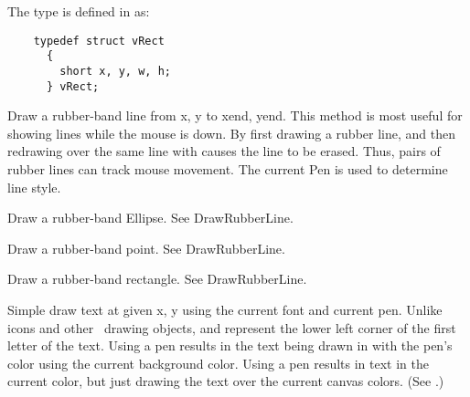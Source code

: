 The type  is defined in  as:
\footnotesize
\begin{verbatim}
    typedef struct vRect
      {
        short x, y, w, h;
      } vRect;
\end{verbatim}
\normalfont\normalsize


Draw a rubber-band line from x, y to xend, yend. This method is most
useful for showing lines while the mouse is down. By first drawing
a rubber line, and then redrawing over the same line with 
causes the line to be erased. Thus, pairs of rubber lines can track
mouse movement. The current Pen is used to determine line style.


Draw a rubber-band Ellipse. See DrawRubberLine.


Draw a rubber-band point. See DrawRubberLine.


Draw a rubber-band rectangle. See DrawRubberLine.


Simple draw text at given x, y using the current font and
current pen. Unlike icons and other \V\ drawing objects,
 and  represent the lower left corner of the
first letter of the text. Using a  pen results
in the text being drawn in with the pen's color using
the current background color. Using a 
pen results in text in the current color, but just drawing
the text over the current canvas colors. (See .)



